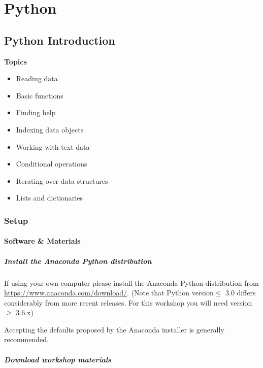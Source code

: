 \documentclass[]{book}
\providecommand{\tightlist}{%
  \setlength{\itemsep}{0pt}\setlength{\parskip}{0pt}}
\begin{document}
\part{Python}\label{part-python}

\chapter{Python Introduction}\label{python-introduction}

\textbf{Topics}

\begin{itemize}
\tightlist
\item
  Reading data
\item
  Basic functions
\item
  Finding help
\item
  Indexing data objects
\item
  Working with text data
\item
  Conditional operations
\item
  Iterating over data structures
\item
  Lists and dictionaries
\end{itemize}

\section{Setup}\label{setup-4}

\subsection{Software \& Materials}\label{software-materials-4}

\subsubsection{Install the Anaconda Python
distribution}\label{install-the-anaconda-python-distribution}

If using your own computer please install the Anaconda Python
distribution from \url{https://www.anaconda.com/download/}. (Note that
Python version\(\leq\) 3.0 differs considerably from more recent
releases. For this workshop you will need version\(\geq\) 3.6.x)

Accepting the defaults proposed by the Anaconda installer is generally
recommended.

\subsubsection{Download workshop
materials}\label{download-workshop-materials}
\end{document}
